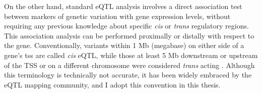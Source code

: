 On the other hand, standard eQTL analysis involves a direct association test between markers of genetic variation with gene expression levels, without requiring any previous knowledge about specific \textit{cis} or \textit{trans} regulatory regions. 
This association analysis can be performed proximally or distally with respect to the gene. 
Conventionally, 
variants within 1 Mb (megabase) on either side of a gene's \gls{tss} are called \textit{cis} eQTL, while those at least 5 Mb downstream or upstream of the TSS or on a different chromosome were considered \textit{trans} acting \cite{nica2013expression, westra2014genome}.
Although this terminology is technically not accurate, it has been widely embraced by the eQTL mapping community, and I adopt this convention in this thesis. 



